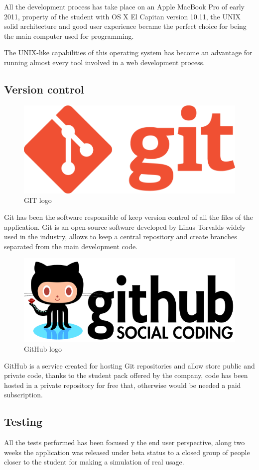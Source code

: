 \documentclass{DeustoFDP}
\begin{document}
All the development process has take place on an Apple MacBook Pro of early 2011, property of the student with OS X El Capitan version 10.11, the UNIX solid architecture and good user experience became the perfect choice for being the main computer used for programming.

The UNIX-like capabilities of this operating system has become an advantage for running almost every tool involved in a web development process.
\subsection{Version control}
\begin{figure}[h]
\centering
\includegraphics[width=0.5\linewidth]{fig/git}
\caption[GIT logo]{GIT logo}
\label{fig:git}
\end{figure}

Git \cite{git} has been the software responsible of keep version control of all the files of the application. Git is an open-source software developed by Linus Torvalds widely used in the industry, allows to keep a central repository and create branches separated from the main development code.

\begin{figure}[h]
\centering
\includegraphics[width=0.7\linewidth]{fig/github-logo}
\caption[GitHub logo]{GitHub logo}
\label{fig:github-logo}
\end{figure}

GitHub \cite{Github} is a service created for hosting Git repositories and allow store public and private code, thanks to the student pack offered by the company, code has been hosted in a private repository for free that, otherwise would be needed a paid subscription.
\newpage
\subsection{Testing}
All the tests performed has been focused y the end user perspective, along two weeks the application was released under beta status to a closed group of people closer to the student for making a simulation of real usage.
\end{document}
